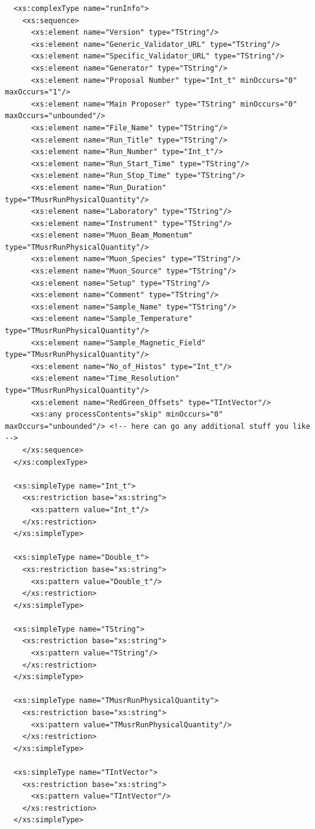 \documentclass[twoside]{article}
\begin{document}
\begin{shaded}
\begin{small}
\begin{verbatim}
  <xs:complexType name="runInfo">
    <xs:sequence>
      <xs:element name="Version" type="TString"/>
      <xs:element name="Generic_Validator_URL" type="TString"/>
      <xs:element name="Specific_Validator_URL" type="TString"/>
      <xs:element name="Generator" type="TString"/>
      <xs:element name="Proposal Number" type="Int_t" minOccurs="0" maxOccurs="1"/>
      <xs:element name="Main Proposer" type="TString" minOccurs="0" maxOccurs="unbounded"/>
      <xs:element name="File_Name" type="TString"/>
      <xs:element name="Run_Title" type="TString"/>
      <xs:element name="Run_Number" type="Int_t"/>
      <xs:element name="Run_Start_Time" type="TString"/>
      <xs:element name="Run_Stop_Time" type="TString"/>
      <xs:element name="Run_Duration" type="TMusrRunPhysicalQuantity"/>
      <xs:element name="Laboratory" type="TString"/>
      <xs:element name="Instrument" type="TString"/>
      <xs:element name="Muon_Beam_Momentum" type="TMusrRunPhysicalQuantity"/>
      <xs:element name="Muon_Species" type="TString"/>
      <xs:element name="Muon_Source" type="TString"/>
      <xs:element name="Setup" type="TString"/>
      <xs:element name="Comment" type="TString"/>
      <xs:element name="Sample_Name" type="TString"/>
      <xs:element name="Sample_Temperature" type="TMusrRunPhysicalQuantity"/>
      <xs:element name="Sample_Magnetic_Field" type="TMusrRunPhysicalQuantity"/>
      <xs:element name="No_of_Histos" type="Int_t"/>
      <xs:element name="Time_Resolution" type="TMusrRunPhysicalQuantity"/>
      <xs:element name="RedGreen_Offsets" type="TIntVector"/>
      <xs:any processContents="skip" minOccurs="0" maxOccurs="unbounded"/> <!-- here can go any additional stuff you like -->
    </xs:sequence>
  </xs:complexType>
 
  <xs:simpleType name="Int_t">
    <xs:restriction base="xs:string">
      <xs:pattern value="Int_t"/>
    </xs:restriction>
  </xs:simpleType>
 
  <xs:simpleType name="Double_t">
    <xs:restriction base="xs:string">
      <xs:pattern value="Double_t"/>
    </xs:restriction>
  </xs:simpleType>
  
  <xs:simpleType name="TString">
    <xs:restriction base="xs:string">
      <xs:pattern value="TString"/>
    </xs:restriction>
  </xs:simpleType> 
   
  <xs:simpleType name="TMusrRunPhysicalQuantity">
    <xs:restriction base="xs:string">
      <xs:pattern value="TMusrRunPhysicalQuantity"/>
    </xs:restriction>
  </xs:simpleType>
  
  <xs:simpleType name="TIntVector">
    <xs:restriction base="xs:string">
      <xs:pattern value="TIntVector"/>
    </xs:restriction>
  </xs:simpleType>
  

\end{verbatim}
\end{small}
\end{shaded}
\end{document}
